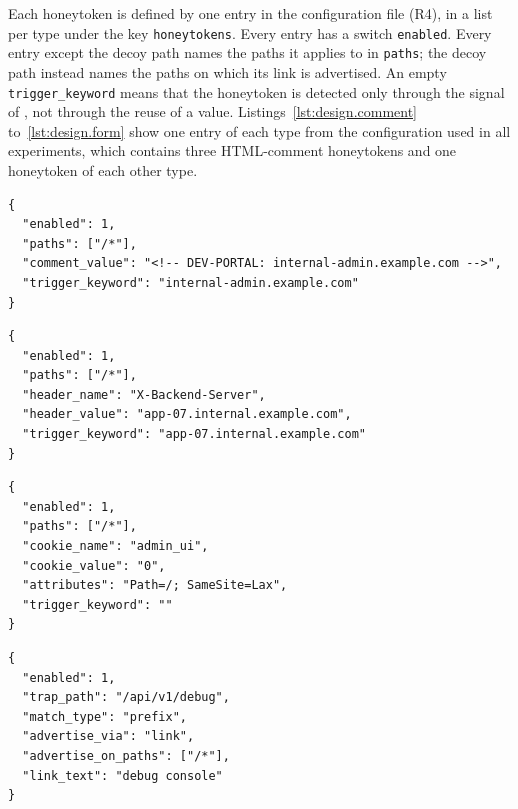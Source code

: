 \documentclass{rptuma}
\begin{document}
Each honeytoken is defined by one entry in the configuration file (R4), in a list per type under the
key \texttt{honeytokens}. Every entry has a switch \texttt{enabled}. Every entry except the decoy
path names the paths it applies to in \texttt{paths}; the decoy path instead names the paths on
which its link is advertised. An empty \texttt{trigger\_keyword} means that the honeytoken is
detected only through the signal of , not through the reuse of a
value. Listings~\ref{lst:design.comment} to~\ref{lst:design.form} show one entry of each type from
the configuration used in all experiments, which contains three HTML-comment honeytokens and one
honeytoken of each other type.

\begin{lstlisting}[caption={An HTML-comment honeytoken. \texttt{comment\_value} is injected before
\texttt{</body>} on every page; \texttt{trigger\_keyword} is searched for in the query string.},
label=lst:design.comment, float=htbp]
{
  "enabled": 1,
  "paths": ["/*"],
  "comment_value": "<!-- DEV-PORTAL: internal-admin.example.com -->",
  "trigger_keyword": "internal-admin.example.com"
}
\end{lstlisting}

\begin{lstlisting}[caption={An HTTP-header honeytoken. The header is set on every response; its
value is the trigger keyword.}, label=lst:design.header, float=htbp]
{
  "enabled": 1,
  "paths": ["/*"],
  "header_name": "X-Backend-Server",
  "header_value": "app-07.internal.example.com",
  "trigger_keyword": "app-07.internal.example.com"
}
\end{lstlisting}

\begin{lstlisting}[caption={A cookie honeytoken. HDM sets \texttt{admin\_ui=0} with the given
attributes and raises an alert when the cookie comes back with another value.},
label=lst:design.cookie, float=htbp]
{
  "enabled": 1,
  "paths": ["/*"],
  "cookie_name": "admin_ui",
  "cookie_value": "0",
  "attributes": "Path=/; SameSite=Lax",
  "trigger_keyword": ""
}
\end{lstlisting}

\begin{lstlisting}[caption={A decoy-path honeytoken. A hidden link to \texttt{trap\_path} is
injected on every page; with \texttt{match\_type} \texttt{prefix}, a request for any path below it
also raises an alert.}, label=lst:design.decoy, float=htbp]
{
  "enabled": 1,
  "trap_path": "/api/v1/debug",
  "match_type": "prefix",
  "advertise_via": "link",
  "advertise_on_paths": ["/*"],
  "link_text": "debug console"
}
\end{lstlisting}
\end{document}
